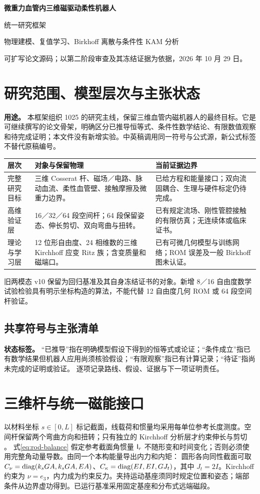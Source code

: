 {\LARGE\bfseries\sffamily\color{inkblue} 微重力血管内三维磁驱动柔性机器人\par 统一研究框架\par}
\vspace{.5em}
{\large 物理建模、复值学习、Birkhoff 离散与条件性 KAM 分析\par}
{\small 可扩写论文源码；以第二阶段审查及其冻结证据为依据，2026 年 10 月 29 日。}

\section{研究范围、模型层次与主张状态}
\textbf{用途。} 本框架组织 1025 的研究主线，保留三维血管内磁机器人的最终目标。它是可继续撰写的论文骨架，明确区分已推导恒等式、条件性数学结论、有限数值观察和待完成证明；本文件没有新增实验。中英稿调用同一符号与公式源，新公式标签不替代原稿编号。

\begin{tabularx}{\textwidth}{@{}P{.2\textwidth}XX@{}}
\toprule
层次 & 对象与保留物理 & 当前证据边界\\
\midrule
完整研究目标 & 三维 Cosserat 杆、磁场／电路、脉动血流、柔性血管壁、接触摩擦及微重力边界。 & 已给方程和能量接口；双向流固耦合、生理与硬件标定仍待完成。\\
高维验证层 & 16／32／64 段空间杆；64 段保留姿态、伸长剪切、双向弯曲与扭转。 & 已有规定流场、刚性管腔接触的有限仿真；无连续体或临床证书。\\
理论与学习层 & 12 位形自由度、24 相维数的三维 Kirchhoff 应变 Ritz 族；含变质量和磁端口。 & 已有可微几何模型与训练网络；ROM 误差及一般 Birkhoff 图未认证。\\
\bottomrule
\end{tabularx}

旧两模态 v10 保留为回归基准及其自身冻结证书的对象。新增 8／16 自由度数学试验检验具有明示坐标构造的算法，不能代替 12 自由度几何 ROM 或 64 段空间杆验证。

\subsection{共享符号与主张清单}


\textbf{状态标签。} “已推导”指在明确模型假设下得到的恒等式或论证；“条件成立”指已有数学结果但机器人应用尚须核验假设；“有限观察”指已有计算记录；“待证”指尚未完成的证明或验证。 逐项记录路线、假设、证据与下一项证明责任。

\PaperPage
\section{三维杆与统一磁能接口}
以材料坐标 $s\in[0,L]$ 标记截面，线载荷和惯量均采用每单位参考长度测度。空间杆保留两个弯曲方向和扭转；只有独立的 Kirchhoff 分析层才约束伸长与剪切 \citep{gazzola2018}。
\EqKinematics
\EqRodBalance
式\eqref{eq:rod-balance} 假定参考截面角惯量 $\mathsf I_r$ 不随形变和时间变化；否则必须使用完整角动量导数。由同一个本构能量导出内力和内矩：
\EqConstitutive
圆形各向同性截面可取 $C_\nu=\operatorname{diag}(k_sGA,k_sGA,EA)$、$C_\kappa=\operatorname{diag}(EI,EI,GJ_t)$，其中 $J_t=2I$。Kirchhoff 约束为 $\nu=e_3$，内力成为约束反力。夹持运动基座须同时规定位置和姿态；端部条件从边界虚功得到。已运行基准采用固定基座和分布式远端磁段。

